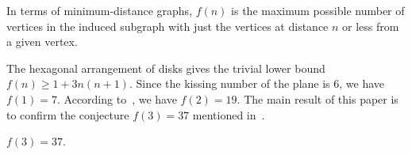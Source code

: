 
In terms of minimum-distance graphs, $f(n)$ is the maximum possible number of vertices in the induced subgraph with just the vertices at distance $n$ or less from a given vertex. %

The hexagonal arrangement of disks gives the trivial lower bound $f(n) \geq 1 + {3n(n+1)}.$ Since the kissing number of the plane is $6$, we have $f(1) = 7$. According to~\cite{toth_heppes}, we have $f(2) = 19$. The main result of this paper is to confirm the conjecture $f(3) = 37$ mentioned in~\cite{furedi}.

\begin{theorem}\label{theorem:f_of_3} $f(3) = 37$.
\end{theorem}




